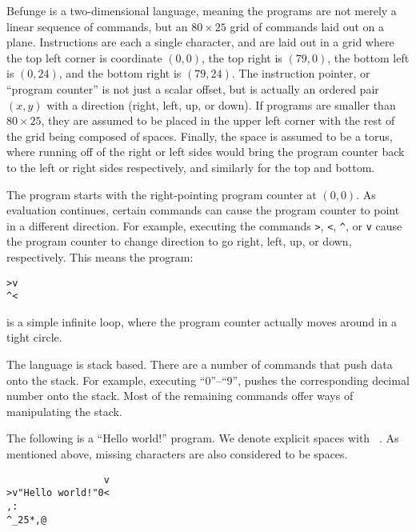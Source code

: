 \begin{latexComment}
Befunge is a two-dimensional language, meaning the programs are not merely a linear sequence of commands, but an $80\times25$ grid of commands laid out on a plane.  Instructions are each a single character, and are laid out in a grid where the top left corner is coordinate $(0, 0)$, the top right is $(79, 0)$, the bottom left is $(0, 24)$, and the bottom right is $(79, 24)$. The instruction pointer, or ``program counter'' is not just a scalar offset, but is actually an ordered pair $(x, y)$ with a direction (right, left, up, or down).  If programs are smaller than $80\times25$, they are assumed to be placed in the upper left corner with the rest of the grid being composed of spaces.  Finally, the space is assumed to be a torus, where running off of the right or left sides would bring the program counter back to the left or right sides respectively, and similarly for the top and bottom.

The program starts with the right-pointing program counter at $(0, 0)$.  As evaluation continues, certain commands can cause the program counter to point in a different direction.  For example, executing the commands \lstinline{>}, \lstinline{<}, \lstinline{^}, or \lstinline{v} cause the program counter to change direction to go right, left, up, or down, respectively.  This means the program:
\begin{lstlisting}
>v
^<
\end{lstlisting}
is a simple infinite loop, where the program counter actually moves around in a tight circle.

The language is stack based.  There are a number of commands that push data onto the stack.  For example, executing ``0''--``9'', pushes the corresponding decimal number onto the stack.  Most of the remaining commands offer ways of manipulating the stack.

The following is a ``Hello world!'' program.  We denote explicit spaces with \lstinline{ }.  As mentioned above, missing characters are also considered to be spaces.
\begin{lstlisting}
                 v
>v"Hello world!"0<
,:
^_25*,@
\end{lstlisting}
\end{latexComment}